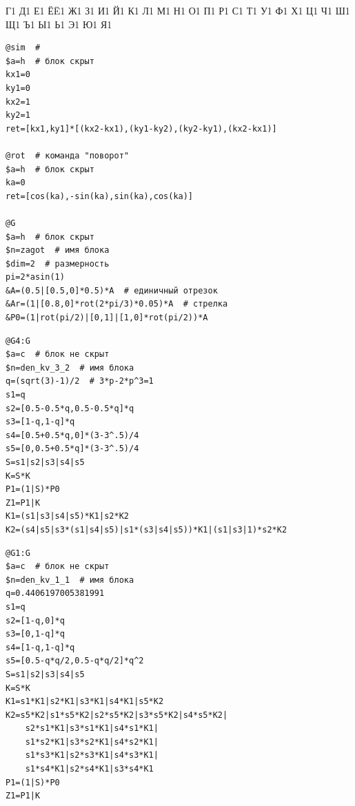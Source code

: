 \documentclass[a4paper,14pt]{extarticle} %
\newcommand{\0}{\varnothing}
\newcommand{\8}{\infty}
\theoremstyle{definition}
\begin{document}
{        {Г}{{\selectfont{}}}1
        {Д}{{\selectfont{}}}1
        {Е}{{\selectfont{}}}1
        {Ё}{{\"E}}1
        {Ж}{{\selectfont{}}}1
        {З}{{\selectfont{}}}1
        {И}{{\selectfont{}}}1
        {Й}{{\selectfont{}}}1
        {К}{{\selectfont{}}}1
        {Л}{{\selectfont{}}}1
        {М}{{\selectfont{}}}1
        {Н}{{\selectfont{}}}1
        {О}{{\selectfont{}}}1
        {П}{{\selectfont{}}}1
        {Р}{{\selectfont{}}}1
        {С}{{\selectfont{}}}1
        {Т}{{\selectfont{}}}1
        {У}{{\selectfont{}}}1
        {Ф}{{\selectfont{}}}1
        {Х}{{\selectfont{}}}1
        {Ц}{{\selectfont{}}}1
        {Ч}{{\selectfont{}}}1
        {Ш}{{\selectfont{}}}1
        {Щ}{{\selectfont{}}}1
        {Ъ}{{\selectfont{}}}1
        {Ы}{{\selectfont{}}}1
        {Ь}{{\selectfont{}}}1
        {Э}{{\selectfont{}}}1
        {Ю}{{\selectfont{}}}1
        {Я}{{\selectfont{}}}1
    }


\begin{lstlisting}[name=aifs,label=list:prev,caption=Описание команд и родительского блока]
@sim  # 
$a=h  # блок скрыт
kx1=0
ky1=0
kx2=1
ky2=1
ret=[kx1,ky1]*[(kx2-kx1),(ky1-ky2),(ky2-ky1),(kx2-kx1)]

@rot  # команда "поворот"
$a=h  # блок скрыт
ka=0
ret=[cos(ka),-sin(ka),sin(ka),cos(ka)]

@G
$a=h  # блок скрыт
$n=zagot  # имя блока
$dim=2  # размерность
pi=2*asin(1)
&A=(0.5|[0.5,0]*0.5)*A  # единичный отрезок
&Ar=(1|[0.8,0]*rot(2*pi/3)*0.05)*A  # стрелка
&P0=(1|rot(pi/2)|[0,1]|[1,0]*rot(pi/2))*A
\end{lstlisting}


\begin{lstlisting}[name=aifs,label=list:prev,caption=Код примера \ref{ex:1}]
@G4:G
$a=c  # блок не скрыт
$n=den_kv_3_2  # имя блока
q=(sqrt(3)-1)/2  # 3*p-2*p^3=1
s1=q
s2=[0.5-0.5*q,0.5-0.5*q]*q
s3=[1-q,1-q]*q
s4=[0.5+0.5*q,0]*(3-3^.5)/4
s5=[0,0.5+0.5*q]*(3-3^.5)/4
S=s1|s2|s3|s4|s5
K=S*K
P1=(1|S)*P0
Z1=P1|K
K1=(s1|s3|s4|s5)*K1|s2*K2
K2=(s4|s5|s3*(s1|s4|s5)|s1*(s3|s4|s5))*K1|(s1|s3|1)*s2*K2
\end{lstlisting}


\begin{lstlisting}[name=aifs,label=list:prev,caption=Код примера \ref{ex:2}]
@G1:G
$a=c  # блок не скрыт
$n=den_kv_1_1  # имя блока
q=0.4406197005381991
s1=q
s2=[1-q,0]*q
s3=[0,1-q]*q
s4=[1-q,1-q]*q
s5=[0.5-q*q/2,0.5-q*q/2]*q^2
S=s1|s2|s3|s4|s5
K=S*K
K1=s1*K1|s2*K1|s3*K1|s4*K1|s5*K2
K2=s5*K2|s1*s5*K2|s2*s5*K2|s3*s5*K2|s4*s5*K2|
    s2*s1*K1|s3*s1*K1|s4*s1*K1|
    s1*s2*K1|s3*s2*K1|s4*s2*K1|
    s1*s3*K1|s2*s3*K1|s4*s3*K1|
    s1*s4*K1|s2*s4*K1|s3*s4*K1
P1=(1|S)*P0
Z1=P1|K
\end{lstlisting}
\end{document}
